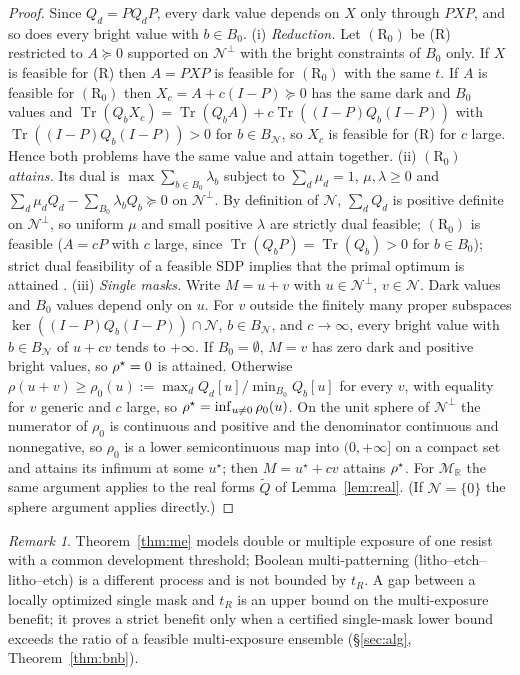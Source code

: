 \documentclass[11pt,a4paper]{article}
\theoremstyle{remark}\newtheorem*{remark}{Remark}
\newcommand{\R}{\mathbb{R}}\newcommand{\C}{\mathbb{C}}\newcommand{\PSD}{\succeq 0}
\DeclareMathOperator{\Tr}{Tr}\DeclareMathOperator{\rank}{rank}\DeclareMathOperator{\conj}{conj}
\begin{document}
\begin{proof}
Since $Q_d=PQ_dP$, every dark value depends on $X$ only through $PXP$, and so does every bright value with $b\in B_0$. (i) \emph{Reduction.} Let $(\mathrm R_0)$ be (R) restricted to $A\PSD$ supported on $\mathcal N^\perp$ with the bright constraints of $B_0$ only. If $X$ is feasible for (R) then $A=PXP$ is feasible for $(\mathrm R_0)$ with the same $t$. If $A$ is feasible for $(\mathrm R_0)$ then $X_c=A+c(I-P)\PSD$ has the same dark and $B_0$ values and $\Tr(Q_bX_c)=\Tr(Q_bA)+c\Tr((I-P)Q_b(I-P))$ with $\Tr((I-P)Q_b(I-P))>0$ for $b\in B_{\mathcal N}$, so $X_c$ is feasible for (R) for $c$ large. Hence both problems have the same value and attain together. (ii) \emph{$(\mathrm R_0)$ attains.} Its dual is $\max\sum_{b\in B_0}\lambda_b$ subject to $\sum_d\mu_d=1$, $\mu,\lambda\ge0$ and $\sum_d\mu_dQ_d-\sum_{B_0}\lambda_bQ_b\PSD$ on $\mathcal N^\perp$. By definition of $\mathcal N$, $\sum_dQ_d$ is positive definite on $\mathcal N^\perp$, so uniform $\mu$ and small positive $\lambda$ are strictly dual feasible; $(\mathrm R_0)$ is feasible ($A=cP$ with $c$ large, since $\Tr(Q_bP)=\Tr(Q_b)>0$ for $b\in B_0$); strict dual feasibility of a feasible SDP implies that the primal optimum is attained \cite{vandenberghe1996}. (iii) \emph{Single masks.} Write $M=u+v$ with $u\in\mathcal N^\perp$, $v\in\mathcal N$. Dark values and $B_0$ values depend only on $u$. For $v$ outside the finitely many proper subspaces $\ker((I-P)Q_b(I-P))\cap\mathcal N$, $b\in B_{\mathcal N}$, and $c\to\infty$, every bright value with $b\in B_{\mathcal N}$ of $u+cv$ tends to $+\infty$. If $B_0=\emptyset$, $M=v$ has zero dark and positive bright values, so $\rho^{\star}=0$ is attained. Otherwise $\rho(u+v)\ge\rho_0(u):=\max_dQ_d[u]/\min_{B_0}Q_b[u]$ for every $v$, with equality for $v$ generic and $c$ large, so $\rho^{\star}=\inf_{u\ne0}\rho_0(u)$. On the unit sphere of $\mathcal N^\perp$ the numerator of $\rho_0$ is continuous and positive and the denominator continuous and nonnegative, so $\rho_0$ is a lower semicontinuous map into $(0,+\infty]$ on a compact set and attains its infimum at some $u^\star$; then $M=u^\star+cv$ attains $\rho^{\star}$. For $\mathcal M_\R$ the same argument applies to the real forms $\tilde Q$ of Lemma~\ref{lem:real}. (If $\mathcal N=\{0\}$ the sphere argument applies directly.)
\end{proof}
\begin{remark}
Theorem~\ref{thm:me} models double or multiple exposure of one resist with a common development threshold; Boolean multi-patterning (litho--etch--litho--etch) is a different process and is not bounded by $t_R$. A gap between a locally optimized single mask and $t_R$ is an upper bound on the multi-exposure benefit; it proves a strict benefit only when a certified single-mask lower bound exceeds the ratio of a feasible multi-exposure ensemble (\S\ref{sec:alg}, Theorem~\ref{thm:bnb}).
\end{remark}
\end{document}

